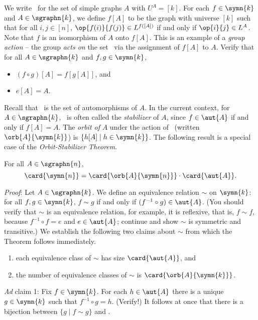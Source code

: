 We write \ for the set of simple graphs $A$ with $U^A = [k]$. For each $f\in\symn{k}$ and $A\in\sgraphn{k}$, we define $f[A]$ to be the graph with universe $[k]$ such that for all $i,j\in[n]$, $\op{f(i)}{f(j)}\in L^{f([A])}$ if and only if $\op{i}{j}\in L^A$. Note that $f$ is an isomorphism of $A$ onto $f[A]$. This is an example of a \emph{group action} -- the group  \emph{acts on} the set \ via the assignment of $f[A]$ to $A$. Verify that for all $A\in\sgraphn{k}$ and $f,g\in\symn{k}$, 
\begin{itemize}
\item
$(f\circ g)[A]=f[g[A]]$, and 
\item
$e[A]=A$.
\end{itemize}
Recall that \ is the set of automorphisms of $A$. In the current context, for $A\in \sgraphn{k}$, \ is often called the \emph{stabilizer} of $A$, since $f\in\aut{A}$ if and only if $f[A] =A$. The \emph{orbit of} $A$  under the action of \ (written $\orb{A}{\symn{k}}$) is $\{h[A]\mid h\in\symn{k}\}$. The following result is a special case of the \emph{Orbit-Stabilizer Theorem}.
\begin{theorem}\label{orb-stab-thm}
For all $A\in\sgraphn{n}$,
\[
\card{\symn{n}}=\card{\orb{A}{\symn{n}}}\cdot\card{\aut{A}}.
\]
\end{theorem}
\emph{Proof}:
Let $A\in\sgraphn{k}$. We define an equivalence relation $\sim$ on $\symn{k}$: for all $f,g\in\symn{k}$, $f\sim g$ if and only if $(f^{-1}\circ g)\in\aut{A}$. (You should verify that $\sim$ is an equivalence relation, for example, it is reflexive, that is, $f\sim f$, because $f^{-1}\circ f = e$ and $e\in \aut{A}$; continue and show $\sim$ is symmetric and transitive.) We establish the following two claims about $\sim$ from which the Theorem follows immediately.
\begin{enumerate}
\item
each equivalence class of $\sim$ has size $\card{\aut{A}}$, and
\item
the number of equivalence classes of $\sim$ is $\card{\orb{A}{\symn{k}}}$.
\end{enumerate}
\emph{Ad} claim 1: Fix $f\in\symn{k}$. For each $h\in\aut{A}$ there is a unique $g\in\symn{k}$ such that $f^{-1}\circ g = h$. (Verify!) It follows at once that there is a bijection between $\{g\mid f\sim g\}$ and .\\
